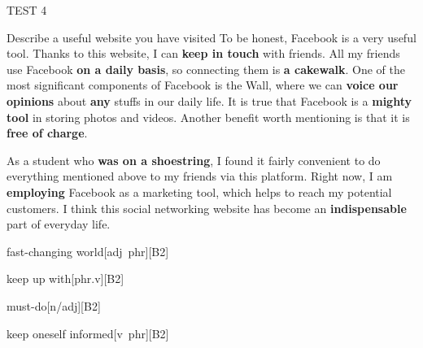 \begin{glossarymc}[Cambridge 4]
\begin{test}{TEST 4}
\begin{qa}{Describe a useful website you have visited}
		To be honest, Facebook is a very useful tool. Thanks to this website, I can \textbf{keep in touch} with friends. All my friends use Facebook \textbf{on a daily basis}, so connecting them is \textbf{a cakewalk}. One of the most significant components of Facebook is the Wall, where we can \textbf{voice our opinions} about \textbf{any} stuffs in our daily life. It is true that Facebook is a \textbf{mighty tool} in storing photos and videos. Another benefit worth mentioning is that it is \textbf{free of charge}.

		As a student who \textbf{was on a shoestring}, I found it fairly convenient to do everything mentioned above to my friends via this platform. Right now, I am \textbf{employing} Facebook as a marketing tool, which helps to reach my potential customers. I think this social networking website has become an \textbf{indispensable} part of everyday life.
		\end{qa}

        \begin{VocabExplain}[Part 2]
			\begin{ExplainCard}{fast-changing world}[adj~phr][B2]
			\end{ExplainCard}

			\begin{ExplainCard}{keep up with}[phr.v][B2]
			\end{ExplainCard}

			\begin{ExplainCard}{must-do}[n/adj][B2]
			\end{ExplainCard}

			\begin{ExplainCard}{keep oneself informed}[v~phr][B2]
			\end{ExplainCard}


\end{VocabExplain}
\end{test}
\end{glossarymc}

